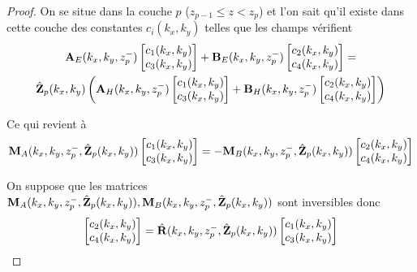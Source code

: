     \begin{proof}
      On se situe dans la couche \(p\) (\(z_{p-1}\le z < z_p\)) et l'on sait qu'il existe dans cette couche des constantes \(c_i(k_x,k_y)\) telles que les champs vérifient
      \begin{multline*}
        \mathbf{A}_{E}(k_x,k_y,z_p^-)
        \begin{bmatrix}
          c_1(k_x,k_y) \\
          c_3(k_x,k_y)
        \end{bmatrix}
        +
        \mathbf{B}_{E}(k_x,k_y,z_p^-)
        \begin{bmatrix}
          c_2(k_x,k_y) \\
          c_4(k_x,k_y)
        \end{bmatrix}
        =
        \\
        \hat {\mathbf{Z}}_{p}(k_x,k_y)
        \left(
          \mathbf{A}_{H}(k_x,k_y,z_p^-)
          \begin{bmatrix}
            c_1(k_x,k_y) \\
            c_3(k_x,k_y)
          \end{bmatrix}
          +
          \mathbf{B}_{H}(k_x,k_y,z_p^-)
          \begin{bmatrix}
            c_2(k_x,k_y) \\
            c_4(k_x,k_y)
          \end{bmatrix}
        \right)
      \end{multline*}

      Ce qui revient à 
      \begin{equation*}
        \mathbf{M}_{A}(k_x,k_y,z_p^-,\hat{\mathbf{Z}}_p(k_x,k_y))
        \begin{bmatrix}
          c_1(k_x,k_y) \\
          c_3(k_x,k_y)
        \end{bmatrix}
        =
        -\mathbf{M}_{B}(k_x,k_y,z_p^-,\hat{\mathbf{Z}}_p(k_x,k_y))
        \begin{bmatrix}
          c_2(k_x,k_y) \\
          c_4(k_x,k_y)
        \end{bmatrix}
      \end{equation*}

      On suppose que les matrices \(\mathbf{M}_{A}(k_x,k_y,z_p^-,\hat{\mathbf{Z}}_p(k_x,k_y)), \mathbf{M}_{B}(k_x,k_y,z_p^-,\hat{\mathbf{Z}}_p(k_x,k_y))\) sont inversibles donc
      \begin{equation*}
        \begin{bmatrix}
          c_2(k_x,k_y) \\
          c_4(k_x,k_y)
        \end{bmatrix}
        =
        \hat{\mathbf{R}}(k_x,k_y,z_p^-,\hat{\mathbf{Z}}_p(k_x,k_y))
        \begin{bmatrix}
          c_1(k_x,k_y) \\
          c_3(k_x,k_y)
        \end{bmatrix}
      \end{equation*}


\end{proof}
